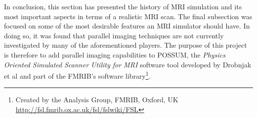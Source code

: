 In conclusion, this section has presented the history of MRI simulation and its most important aspects in terms of a realistic MRI scan. The final subsection was focused on some of the most desirable features an MRI simulator should have. In doing so, it was found that parallel imaging techniques are not currently investigated by many of the aforementioned players. The purpose of this project is therefore to add parallel imaging capabilities to POSSUM, the \textit{Physics Oriented Simulated Scanner Utility for MRI} software tool developed by Drobnjak et al \cite{Drobnjak2006} and part of the FMRIB's software library\footnote{Created by the Analysis Group, FMRIB, Oxford, UK  \url{http://fsl.fmrib.ox.ac.uk/fsl/fslwiki/FSL}}.

